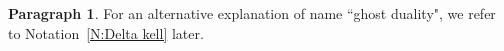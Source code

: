 \documentclass[12pt]{amsart}
\theoremstyle{definition}
\newtheorem{remark}[subsection]{Remark}
\newtheorem{para}[subsection]{Paragraph}
\numberwithin{equation}{subsection}
\newcommand{\new}{\mathrm{new}}
\newcommand{\unr}{\mathrm{ur}}
\begin{document}
\begin{para}
\label{P:para_134}
For an alternative explanation of name ``ghost duality", we refer to Notation~\ref{N:Delta kell} later.
\end{para}
\end{document}
